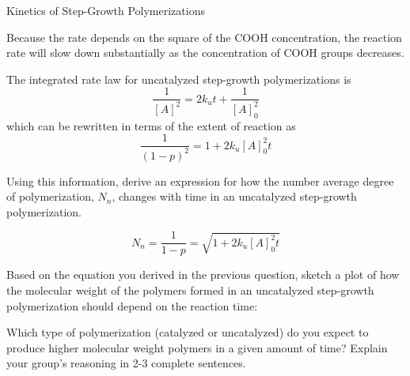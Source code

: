 \begin{activity}{Kinetics of Step-Growth Polymerizations}
\begin{ctqs}
\begin{enumerate}
				\begin{solution}[0.75in]	
					Because the rate depends on the square of the COOH concentration, the reaction rate will slow down substantially as the concentration of COOH groups decreases.
				\end{solution}
			
		\end{enumerate}
	
\end{ctqs}

\begin{infobox}\label{\labelbase:info:uncatintrate}
	The integrated rate law for uncatalyzed step-growth polymerizations is
	\begin{equation*}
		\frac{1}{[A]^2} = 2k_u t + \frac{1}{[A]_0^2}
	\end{equation*}
	which can be rewritten in terms of the extent of reaction as
	\begin{equation*}
		\frac{1}{(1-p)^2} = 1 + 2k_u [A]_0^2 t
	\end{equation*}
\end{infobox}

\begin{ctqs}

	\question Using this information, derive an expression for how the number average degree of polymerization, $N_n$, changes with time in an uncatalyzed step-growth polymerization.
	
		\begin{solution}[1.25in]
			\begin{equation*}
				N_n = \frac{1}{1-p} = \sqrt{1 + 2k_u [A]_0^2 t}
			\end{equation*}
		\end{solution}
		
	\question Based on the equation you derived in the previous question, sketch a plot of how the molecular weight of the polymers formed in an uncatalyzed step-growth polymerization should depend on the reaction time:
	
		\begin{solution}[2in]
		\end{solution}		
		
	\question Which type of polymerization (catalyzed or uncatalyzed) do you expect to produce higher molecular weight polymers in a given amount of time?  Explain your group's reasoning in 2-3 complete sentences.
	

\end{ctqs}
\end{activity}

